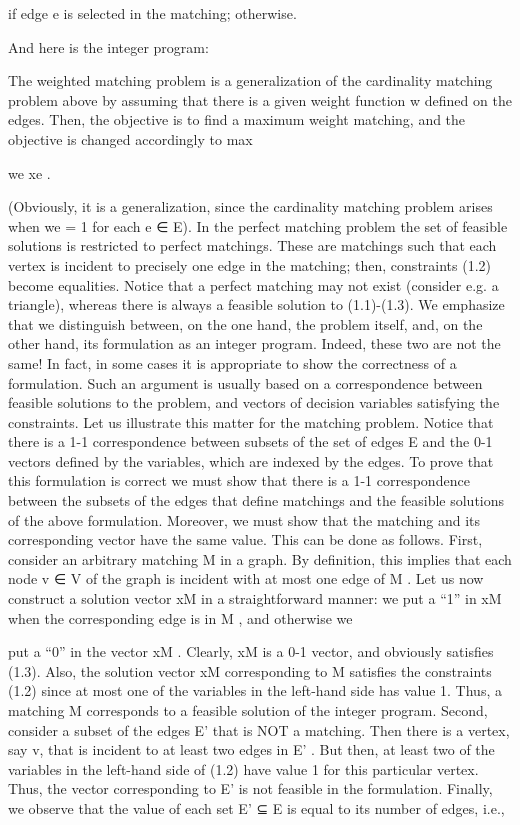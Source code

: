 \documentclass[titlepage]{book}
\begin{document}

if edge e is selected in the matching;
otherwise.

And here is the integer program:


The weighted matching problem is a generalization of the cardinality matching problem above by assuming that there is a given weight function w defined on the edges. Then, the objective is to find a
maximum weight matching, and the objective is changed accordingly to max


we xe . 

(Obviously, it is a generalization, since the cardinality matching problem arises when we = 1 for each e ∈ E). In
the perfect matching problem the set of feasible solutions is restricted to perfect matchings. These are
matchings such that each vertex is incident to precisely one edge in the matching; then, constraints (1.2)
become equalities. Notice that a perfect matching may not exist (consider e.g. a triangle), whereas there
is always a feasible solution to (1.1)-(1.3). %
We emphasize that we distinguish between, on the one hand, the problem itself, and, on the other hand,
its formulation as an integer program. Indeed, these two are not the same! In fact, in some cases
it is appropriate to show the correctness of a formulation. Such an argument is usually based on a
correspondence between feasible solutions to the problem, and vectors of decision variables satisfying the
constraints.
Let us illustrate this matter for the matching problem. Notice that there is a 1-1 correspondence between
subsets of the set of edges E and the 0-1 vectors defined by the variables, which are indexed by the edges.
To prove that this formulation is correct we must show that there is a 1-1 correspondence between the
subsets of the edges that define matchings and the feasible solutions of the above formulation. Moreover,
we must show that the matching and its corresponding vector have the same value. This can be done as
follows. First, consider an arbitrary matching M in a graph. By definition, this implies that each node
v ∈ V of the graph is incident with at most one edge of M . Let us now construct a solution vector xM in
a straightforward manner: we put a “1” in xM when the corresponding edge is in M , and otherwise we

put a “0” in the vector xM . Clearly, xM is a 0-1 vector, and obviously satisfies (1.3). Also, the solution
vector xM corresponding to M satisfies the constraints (1.2) since at most one of the variables in the
left-hand side has value 1. Thus, a matching M corresponds to a feasible solution of the integer program.
Second, consider a subset of the edges E' that is NOT a matching. Then there is a vertex, say v, that
is incident to at least two edges in E' . But then, at least two of the variables in the left-hand side of
(1.2) have value 1 for this particular vertex. Thus, the vector corresponding to E' is not feasible in the
formulation. Finally, we observe that the value of each set E' ⊆ E is equal to its number of edges, i.e.,
\end{document}
